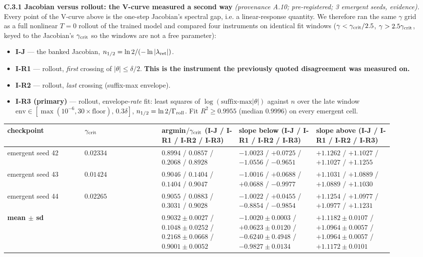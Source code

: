 \documentclass{article}
\begin{document}
\textbf{C.3.1 Jacobian versus rollout: the V-curve measured a second way} \emph{(provenance A.10; pre-registered; 3 emergent seeds, evidence).} Every point of the V-curve above is the one-step Jacobian's spectral gap, i.e. a linear-response quantity. We therefore ran the same $\gamma$ grid as a full nonlinear $T=0$ rollout of the trained model and compared four instruments on identical fit windows ($\gamma<\gamma_{\rm crit}/2.5$, $\gamma>2.5\gamma_{\rm crit}$, keyed to the Jacobian's $\gamma_{\rm crit}$ so the windows are not a free parameter):

\begin{itemize}
\item \textbf{I-J} --- the banked Jacobian, $n_{1/2}=\ln2/(-\ln|\lambda_{\rm ret}|)$.
\item \textbf{I-R1} --- rollout, \emph{first} crossing of $|\theta|\le\delta/2$. \textbf{This is the instrument the previously quoted disagreement was measured on.}
\item \textbf{I-R2} --- rollout, \emph{last} crossing (suffix-max envelope).
\item \textbf{I-R3 (primary)} --- rollout, envelope-\emph{rate} fit: least squares of $\log(\text{suffix-max}|\theta|)$ against $n$ over the late window $\text{env}\in[\max(10^{-6},30\times\text{floor}),\,0.3\delta]$, $n_{1/2}=\ln2/\Gamma_{\rm roll}$. Fit $R^2\ge0.9955$ (median $0.9996$) on every emergent cell.
\end{itemize}

\begin{table}[t]\centering\small
\begin{tabular}{p{0.184\linewidth}p{0.184\linewidth}p{0.184\linewidth}p{0.184\linewidth}p{0.184\linewidth}}
\toprule
checkpoint & $\gamma_{\rm crit}$ & argmin$/\gamma_{\rm crit}$ (I-J / I-R1 / I-R2 / \textbf{I-R3}) & slope below (I-J / I-R1 / I-R2 / \textbf{I-R3}) & slope above (I-J / I-R1 / I-R2 / \textbf{I-R3}) \\
\midrule
emergent seed 42 & $0.02334$ & $0.8994$ / $0.0857$ / $0.2068$ / \textbf{$0.8928$} & $-1.0023$ / $+0.0725$ / $-1.0556$ / \textbf{$-0.9651$} & $+1.1262$ / $+1.1027$ / $+1.1027$ / \textbf{$+1.1255$} \\
emergent seed 43 & $0.01424$ & $0.9046$ / $0.1404$ / $0.1404$ / \textbf{$0.9047$} & $-1.0016$ / $+0.0688$ / $+0.0688$ / \textbf{$-0.9977$} & $+1.1031$ / $+1.0889$ / $+1.0889$ / \textbf{$+1.1030$} \\
emergent seed 44 & $0.02265$ & $0.9055$ / $0.0883$ / $0.3031$ / \textbf{$0.9028$} & $-1.0022$ / $+0.0455$ / $-0.8854$ / \textbf{$-0.9854$} & $+1.1254$ / $+1.0977$ / $+1.0977$ / \textbf{$+1.1231$} \\
\textbf{mean $\pm$ sd} &  & \textbf{$0.9032\pm0.0027$} / $0.1048\pm0.0252$ / $0.2168\pm0.0668$ / \textbf{$0.9001\pm0.0052$} & \textbf{$-1.0020\pm0.0003$} / $+0.0623\pm0.0120$ / $-0.6240\pm0.4948$ / \textbf{$-0.9827\pm0.0134$} & \textbf{$+1.1182\pm0.0107$} / $+1.0964\pm0.0057$ / $+1.0964\pm0.0057$ / \textbf{$+1.1172\pm0.0101$} \\
\bottomrule
\end{tabular}
\end{table}
\end{document}
